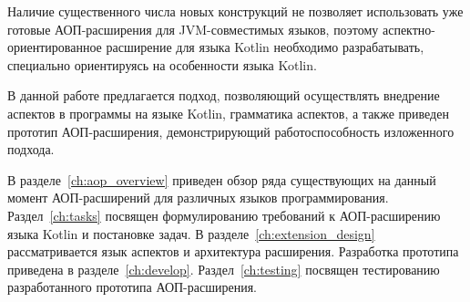 Наличие существенного числа новых конструкций не позволяет использовать уже 
готовые АОП-расширения для JVM-совместимых языков, поэтому
аспектно-ориентированное  расширение для языка Kotlin необходимо разрабатывать,
специально ориентируясь на особенности языка Kotlin.

В данной работе предлагается подход, позволяющий осуществлять внедрение аспектов в программы на языке Kotlin, грамматика аспектов, а также приведен прототип АОП-расширения, демонстрирующий работоспособность изложенного подхода.

В разделе~\ref{ch:aop_overview} приведен обзор ряда существующих на данный момент АОП-расширений для различных языков программирования.
Раздел~\ref{ch:tasks} посвящен формулированию требований к АОП-расширению языка Kotlin и постановке задач.
В разделе~\ref{ch:extension_design} рассматривается язык аспектов и архитектура расширения.
Разработка прототипа приведена в разделе~\ref{ch:develop}.
Раздел~\ref{ch:testing} посвящен тестированию разработанного прототипа АОП-расширения.